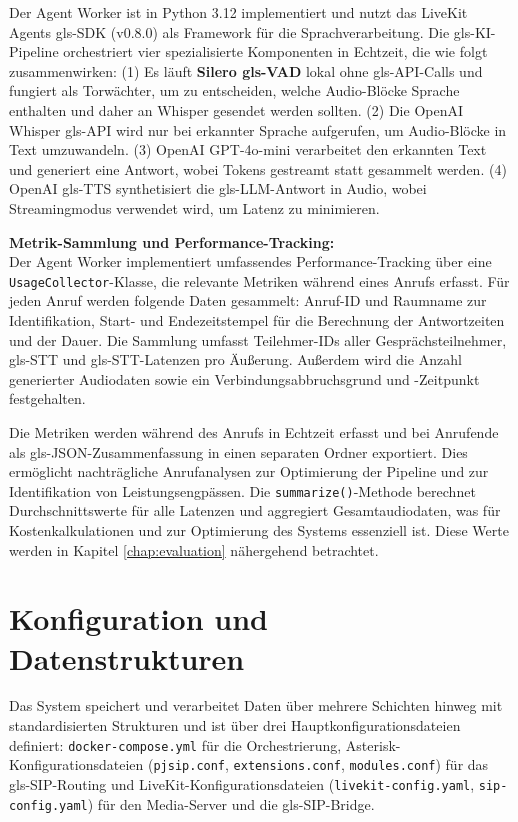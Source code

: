 Der Agent Worker ist in Python 3.12 implementiert und nutzt das LiveKit Agents \gls{gls-SDK} (v0.8.0) als Framework für die Sprachverarbeitung. Die \gls{gls-KI}-Pipeline orchestriert vier spezialisierte Komponenten in Echtzeit, die wie folgt zusammenwirken: (1) Es läuft \textbf{Silero \gls{gls-VAD}} lokal ohne \gls{gls-API}-Calls und fungiert als Torwächter, um zu entscheiden, welche Audio-Blöcke Sprache enthalten und daher an Whisper gesendet werden sollten. (2) Die OpenAI Whisper \gls{gls-API} wird nur bei erkannter Sprache aufgerufen, um Audio-Blöcke in Text umzuwandeln. (3)  OpenAI GPT-4o-mini verarbeitet den erkannten Text und generiert eine Antwort, wobei Tokens gestreamt statt gesammelt werden. (4) OpenAI \gls{gls-TTS}  synthetisiert die \gls{gls-LLM}-Antwort in Audio, wobei Streamingmodus verwendet wird, um Latenz zu minimieren.

\textbf{Metrik-Sammlung und Performance-Tracking:}\\
Der Agent Worker implementiert umfassendes Performance-Tracking über eine \texttt{UsageCollector}-Klasse, die relevante Metriken während eines Anrufs erfasst. Für jeden Anruf werden folgende Daten gesammelt: Anruf-ID und Raumname zur Identifikation, Start- und Endezeitstempel für die Berechnung der Antwortzeiten und der Dauer. Die Sammlung umfasst Teilehmer-IDs aller Gesprächsteilnehmer, \gls{gls-STT} und \gls{gls-STT}-Latenzen pro Äu\ss erung. Au\ss erdem wird die Anzahl generierter Audiodaten sowie ein Verbindungsabbruchsgrund und -Zeitpunkt festgehalten.

Die Metriken werden während des Anrufs in Echtzeit erfasst und bei Anrufende als \gls{gls-JSON}-Zusammenfassung in einen separaten Ordner exportiert. Dies ermöglicht nachträgliche Anrufanalysen zur Optimierung der Pipeline und zur Identifikation von Leistungsengpässen. Die \texttt{summarize()}-Methode berechnet Durchschnittswerte für alle Latenzen und aggregiert Gesamtaudiodaten, was für Kostenkalkulationen und zur Optimierung des Systems essenziell ist. Diese Werte werden in Kapitel \ref{chap:evaluation} nähergehend betrachtet.

\section{Konfiguration und Datenstrukturen}

Das System speichert und verarbeitet Daten über mehrere Schichten hinweg mit standardisierten Strukturen und ist über drei Hauptkonfigurationsdateien definiert: \texttt{docker-compose.yml} für die Orchestrierung, Asterisk-Konfigurationsdateien (\texttt{pjsip.conf}, \texttt{extensions.conf}, \texttt{modules.conf}) für das \gls{gls-SIP}-Routing und
LiveKit-Konfigurationsdateien (\texttt{livekit-config.yaml}, \texttt{sip-config.yaml}) für den Media-Server und die \gls{gls-SIP}-Bridge.

